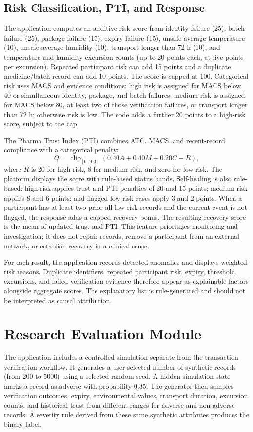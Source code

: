\documentclass[conference]{IEEEtran}
\begin{document}
\subsection{Risk Classification, PTI, and Response}
The application computes an additive risk score from identity failure (25), batch failure (25), package failure (15), expiry failure (15), unsafe average temperature (10), unsafe average humidity (10), transport longer than 72 h (10), and temperature and humidity excursion counts (up to 20 points each, at five points per excursion). Repeated participant risk can add 15 points and a duplicate medicine/batch record can add 10 points. The score is capped at 100. Categorical risk uses MACS and evidence conditions: high risk is assigned for MACS below 40 or simultaneous identity, package, and batch failures; medium risk is assigned for MACS below 80, at least two of those verification failures, or transport longer than 72 h; otherwise risk is low. The code adds a further 20 points to a high-risk score, subject to the cap.

The Pharma Trust Index (PTI) combines ATC, MACS, and recent-record compliance with a categorical penalty:
\begin{equation}
 Q=\operatorname{clip}_{[0,100]}(0.40A+0.40M+0.20C-R),
 \label{eq:pti}
\end{equation}
where $R$ is 20 for high risk, 8 for medium risk, and zero for low risk. The platform displays the score with rule-based status bands. Self-healing is also rule-based: high risk applies trust and PTI penalties of 20 and 15 points; medium risk applies 8 and 6 points; and flagged low-risk cases apply 3 and 2 points. When a participant has at least two prior all-low-risk records and the current event is not flagged, the response adds a capped recovery bonus. The resulting recovery score is the mean of updated trust and PTI. This feature prioritizes monitoring and investigation; it does not repair records, remove a participant from an external network, or establish recovery in a clinical sense.

For each result, the application records detected anomalies and displays weighted risk reasons. Duplicate identifiers, repeated participant risk, expiry, threshold excursions, and failed verification evidence therefore appear as explainable factors alongside aggregate scores. The explanatory list is rule-generated and should not be interpreted as causal attribution.

\section{Research Evaluation Module}
The application includes a controlled simulation separate from the transaction verification workflow. It generates a user-selected number of synthetic records (from 200 to 5000) using a selected random seed. A hidden simulation state marks a record as adverse with probability 0.35. The generator then samples verification outcomes, expiry, environmental values, transport duration, excursion counts, and historical trust from different ranges for adverse and non-adverse records. A severity rule derived from these same synthetic attributes produces the binary label.
\end{document}
